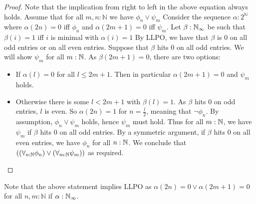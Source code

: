 \begin{proof}
  Note that the implication from right to left in the above equation always holds.
  Assume that for all $m,n:\mathbb N$ we have $\phi_n\vee \psi_m$ 
  Consider the sequence $\alpha:2^\mathbb N$ where $\alpha(2n) = 0$ iff $\phi_n$ and 
  $\alpha(2m+1) = 0$ iff $\psi_m$. 
  Let $\beta:\mathbb{N}_{\infty}$ be such that $\beta(i) = 1$ iff $i$ is minimal with $\alpha(i) = 1$
  By LLPO, we have that 
  $\beta$ is $0$ on all odd entries or on all even entries. 
  Suppose that $\beta$ hits $0$ on all odd entries. 
  We will show $\psi_m$ for all $m:\mathbb{N}$. 
  As $\beta(2m+1) = 0$, there are two options:
  \begin{itemize}
    	\item If $\alpha(l)=0$ for all $l\leq 2m+1$. Then in particular $\alpha(2m+1)=0$ and $\psi_m$ holds.
	\item Otherwise there is some $l<2m+1$ with $\beta(l) = 1$. 
  As $\beta$ hits $0$ on odd entries, $l$ is even. 
  So $\alpha(2n) = 1$ for $n = \frac{l}2$, meaning that $\neg \phi_n$. 
  By assumption, $\phi_n \vee \psi_m$ holds, hence $\psi_m$ must hold. 
  Thus for all $m:\mathbb{N}$, we have $\psi_m$ if $\beta$ hits $0$ on all odd entries. 
  By a symmetric argument, if $\beta$ hits $0$ on all even entries, we have $\phi_n$ for all $n:\mathbb{N}$. 
  We conclude that 
  $((\forall_{n:\mathbb{N}} \phi_n) \vee (\forall_{m:\mathbb{N}} \psi_m) )$ 
  as required. 
  \end{itemize}
\end{proof}

\begin{remark}
Note that the above statement implies LLPO as $\alpha(2n) =0 \vee \alpha(2m+1) =0$ for all $n,m:\mathbb N$ if $\alpha:\mathbb{N}_{\infty}$. 
\end{remark}
